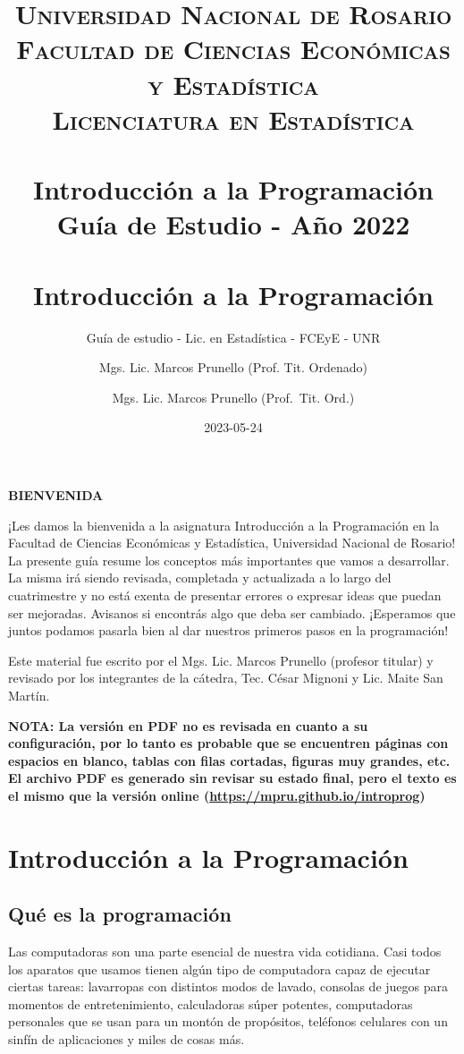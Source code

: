 \documentclass[
]{book}
\title{
	\usefont{OT1}{bch}{b}{n}
	\normalfont \normalsize
	\textsc{
		Universidad Nacional de Rosario \\
		Facultad de Ciencias Económicas y Estadística \\
		Licenciatura en Estadística
	} \\ [25pt]
	\horrule{2pt} \\[0.4cm]
	\huge \textbf{Introducción a la Programación} \\
	\bigbreak
	Guía de Estudio - Año 2022\\
	\horrule{2pt} \\[0.5cm]}
\author{
	\normalfont Mgs. Lic. Marcos Prunello (Prof. Tit. Ordenado)
}
\title{Introducción a la Programación}
\subtitle{Guía de estudio - Lic. en Estadística - FCEyE - UNR}
\author{Mgs. Lic. Marcos Prunello (Prof.~Tit. Ord.)}
\date{2023-05-24}
\begin{document}
\maketitle

{
\setcounter{tocdepth}{1}
\tableofcontents
}
\newpage

\textbf{BIENVENIDA}

\vspace{\baselineskip}

¡Les damos la bienvenida a la asignatura Introducción a la Programación en la Facultad de Ciencias Económicas y Estadística, Universidad Nacional de Rosario! La presente guía resume los conceptos más importantes que vamos a desarrollar. La misma irá siendo revisada, completada y actualizada a lo largo del cuatrimestre y no está exenta de presentar errores o expresar ideas que puedan ser mejoradas. Avisanos si encontrás algo que deba ser cambiado. ¡Esperamos que juntos podamos pasarla bien al dar nuestros primeros pasos en la programación!

\vspace{\baselineskip}

Este material fue escrito por el Mgs. Lic. Marcos Prunello (profesor titular) y revisado por los integrantes de la cátedra, Tec. César Mignoni y Lic. Maite San Martín.

\vspace{\baselineskip}

\textbf{NOTA: La versión en PDF no es revisada en cuanto a su configuración, por lo tanto es probable que se encuentren páginas con espacios en blanco, tablas con filas cortadas, figuras muy grandes, etc. El archivo PDF es generado sin revisar su estado final, pero el texto es el mismo que la versión online (\url{https://mpru.github.io/introprog})}

\hypertarget{introducciuxf3n-a-la-programaciuxf3n}{%
\chapter{Introducción a la Programación}\label{introducciuxf3n-a-la-programaciuxf3n}}

\hypertarget{quuxe9-es-la-programaciuxf3n}{%
\section{Qué es la programación}\label{quuxe9-es-la-programaciuxf3n}}

Las computadoras son una parte esencial de nuestra vida cotidiana. Casi todos los aparatos que usamos tienen algún tipo de computadora capaz de ejecutar ciertas tareas: lavarropas con distintos modos de lavado, consolas de juegos para momentos de entretenimiento, calculadoras súper potentes, computadoras personales que se usan para un montón de propósitos, teléfonos celulares con un sinfín de aplicaciones y miles de cosas más.
\end{document}
